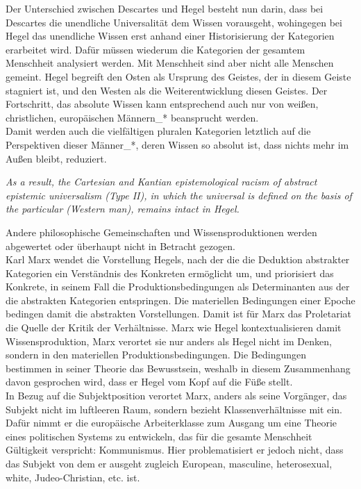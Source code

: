 \noindent Der Unterschied zwischen Descartes und Hegel besteht nun darin, dass bei
Descartes die unendliche Universalität dem Wissen vorausgeht, wohingegen bei
Hegel das unendliche Wissen erst anhand einer Historisierung der Kategorien
erarbeitet wird. Dafür müssen wiederum die Kategorien der gesamtem Menschheit
analysiert werden.  Mit Menschheit sind aber nicht alle Menschen gemeint. Hegel
begreift den Osten als Ursprung des Geistes, der in diesem Geiste stagniert
ist, und den Westen als die Weiterentwicklung diesen Geistes. Der Fortschritt,
das absolute Wissen kann entsprechend auch nur von weißen, christlichen,
europäischen Männern\_* beansprucht werden.\\
Damit werden auch die vielfältigen pluralen Kategorien letztlich auf die
Perspektiven dieser Männer\_*, deren Wissen so absolut ist, dass nichts mehr im
Außen bleibt, reduziert.  
\begin{myenv} 
  \textit{\glqq As a result, the Cartesian and Kantian
  epistemological racism of abstract epistemic universalism (Type II), in which
the universal is defined on the basis of the particular (Western man), remains
intact in Hegel.\grqq \footnotemark {} }
\end{myenv}
Andere philosophische Gemeinschaften und Wissensproduktionen werden abgewertet oder überhaupt nicht in Betracht gezogen.\\

Karl Marx wendet die Vorstellung Hegels, nach der die die Deduktion abstrakter
Kategorien ein Verständnis des Konkreten ermöglicht um, und priorisiert das
Konkrete, in seinem Fall die Produktionsbedingungen als Determinanten aus der
die abstrakten Kategorien entspringen.\footnotemark {} Die materiellen Bedingungen einer
Epoche bedingen damit die abstrakten Vorstellungen. Damit ist für Marx das
Proletariat die Quelle der Kritik der Verhältnisse. Marx wie Hegel
kontextualisieren damit Wissensproduktion, Marx verortet sie nur anders als
Hegel nicht im Denken, sondern in den materiellen Produktionsbedingungen. Die
Bedingungen bestimmen in seiner Theorie das Bewusstsein, weshalb in diesem
Zusammenhang davon gesprochen wird, dass er Hegel vom Kopf auf die Füße stellt.\\
In Bezug auf die Subjektposition verortet Marx, anders als seine Vorgänger, das
Subjekt nicht im luftleeren Raum, sondern bezieht Klassenverhältnisse mit ein.
Dafür nimmt er die europäische Arbeiterklasse zum Ausgang um eine Theorie eines
politischen Systems zu entwickeln, das für die gesamte Menschheit Gültigkeit
verspricht: Kommunismus. Hier problematisiert er jedoch nicht, dass das Subjekt
von dem er ausgeht zugleich  \glqq European, masculine, heterosexual, white,
Judeo-Christian, etc.\grqq \footnotemark {} ist.\\

